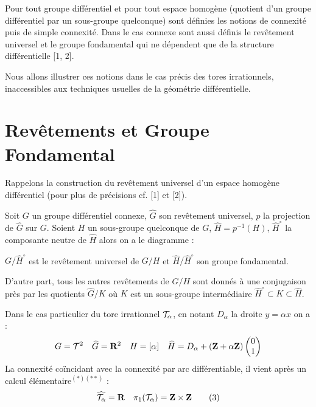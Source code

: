 \documentclass[10pt]{amsart}
\renewcommand{\Torus}{\cT}
\renewcommand{\UniversalCover}[1]{\widehat{#1}}
\begin{document}
  Pour tout groupe différentiel et pour tout espace homogène (quotient d'un groupe différentiel par un sous-groupe quelconque) sont définies les notions de connexité puis de simple connexité.
  Dans le cas connexe sont aussi définis le revêtement universel et le groupe fondamental qui ne dépendent que de la structure différentielle [1, 2].
  
  Nous allons illustrer ces notions dans le cas précis des tores irrationnels,
  inaccessibles aux techniques usuelles de la géométrie différentielle.
  
  \section*{Revêtements et Groupe Fondamental}
  Rappelons la construction du revêtement universel d'un espace homogène différentiel (pour plus de précisions cf. [1] et [2]).
  
  Soit $G$ un groupe différentiel connexe,
  $\UniversalCover{G}$ son revêtement universel,
  $p$ la projection de $\UniversalCover{G}$ sur $G$.
  Soient $H$ un sous-groupe quelconque de $G$,
  $\UniversalCover{H} = p^{-1}(H)$,
  $\UniversalCover{H}^{\circ}$ la composante neutre de $\UniversalCover{H}$ alors on a le diagramme :
  
  \begin{center}
  \end{center}
  
  $G / \UniversalCover{H}^{\circ}$ est le revêtement universel de $G / H$ et $\UniversalCover{H} / \UniversalCover{H}^{\circ}$ son groupe fondamental.
  
  D'autre part,
  tous les autres revêtements de $G/H$ sont donnés à une conjugaison près par les quotients $\UniversalCover{G} / K$ où $K$ est un sous-groupe intermédiaire $\UniversalCover{H}^{\circ} \subset K \subset \UniversalCover{H}$.
  
  Dans le cas particulier du tore irrationnel $\Torus_{\alpha}$,
  en notant $D_{\alpha}$ la droite $y = \alpha x$ on a :
  $$
    G = \Torus^2 \quad \UniversalCover{G} = \fieldR^{2} \quad H = [\alpha] \quad \UniversalCover{H} = D_{\alpha} + (\ringZ + \alpha \ringZ) \Vector{ 0 \\ 1 }
    $$
  La connexité coïncidant avec la connexité par arc différentiable,
  il vient après un calcul élémentaire$^{(*) (**)}$ :
  \begin{equation}
    \UniversalCover{\Torus_{\alpha}} = \fieldR \quad \FundamentalGroup(\Torus_{\alpha}) = \ringZ \times \ringZ \tag{3}
  \end{equation}
  
\end{document}

